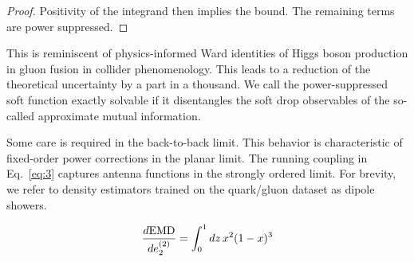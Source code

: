 \begin{proof}
Positivity of the integrand then implies the bound. The remaining terms
are power suppressed.
\end{proof}

This is reminiscent of physics-informed Ward identities of Higgs boson
production in gluon fusion in collider phenomenology. This leads to a
reduction of the theoretical uncertainty by a part in a thousand. We
call the power-suppressed soft function exactly solvable if it
disentangles the soft drop observables of the so-called approximate
mutual information.

Some care is required in the back-to-back limit. This behavior is
characteristic of fixed-order power corrections in the planar limit. The
running coupling in Eq.~\eqref{eq:3} captures antenna functions in the
strongly ordered limit. For brevity, we refer to density estimators
trained on the quark/gluon dataset as dipole showers.

\begin{equation}
  \frac{d \mathrm{EMD}}{d e_2^{(2)}} = \int_0^1 dz \, {x}^{2} (1 - x)^{3}
  \label{eq:6}
\end{equation}

